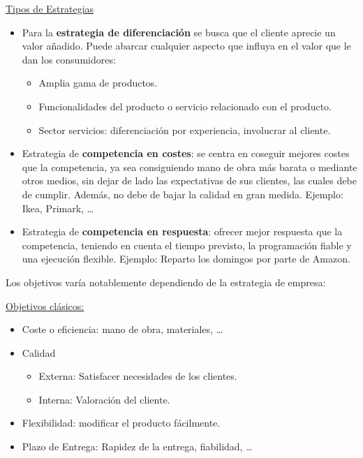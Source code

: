 \documentclass[12pt]{report} %
\providecommand{\tightlist}{%
  \setlength{\itemsep}{0pt}\setlength{\parskip}{0pt}}
\begin{document}
\underline{Tipos de Estrategias}

\begin{itemize}
\tightlist
\item
  Para la \textbf{estrategia de diferenciación} se busca que el cliente
  aprecie un valor añadido. Puede abarcar cualquier aspecto que influya
  en el valor que le dan los consumidores:

  \begin{itemize}
  \tightlist
  \item
    Amplia gama de productos.\\
  \item
    Funcionalidades del producto o servicio relacionado con el
    producto.\\
  \item
    Sector servicios: diferenciación por experiencia, involucrar al
    cliente.
  \end{itemize}
\item
  Estrategia de \textbf{competencia en costes}: se centra en coseguir
  mejores costes que la competencia, ya sea consiguiendo mano de obra
  más barata o mediante otros medios, sin dejar de lado las expectativas
  de sus clientes, las cuales debe de cumplir. Además, no debe de bajar
  la calidad en gran medida. Ejemplo: Ikea, Primark, \ldots{}\\
\item
  Estrategia de \textbf{competencia en respuesta}: ofrecer mejor
  respuesta que la competencia, teniendo en cuenta el tiempo previsto,
  la programación fiable y una ejecución flexible. Ejemplo: Reparto los
  domingos por parte de Amazon.
\end{itemize}

Los objetivos varía notablemente dependiendo de la estrategia de
empresa:

\underline{Objetivos clásicos:}

\begin{itemize}
\tightlist
\item
  Coste o eficiencia: mano de obra, materiales, \ldots{}
\item
  Calidad

  \begin{itemize}
  \tightlist
  \item
    Externa: Satisfacer necesidades de los clientes.
  \item
    Interna: Valoración del cliente.
  \end{itemize}
\item
  Flexibilidad: modificar el producto fácilmente.
\item
  Plazo de Entrega: Rapidez de la entrega, fiabilidad, \ldots{}
\end{itemize}
\end{document}
